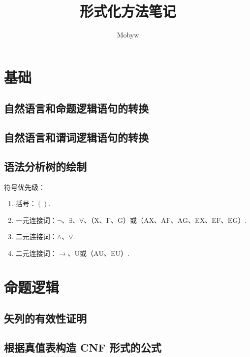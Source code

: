 \documentclass[cn, hazy, blue, normal, 12pt]{elegantnote}
\title{形式化方法笔记}
\author{Mobyw}
\institute{Created by Elegant\LaTeX{}}
\date{\zhtoday}
\begin{document}
\maketitle

\section{基础}

\subsection{自然语言和命题逻辑语句的转换}



\subsection{自然语言和谓词逻辑语句的转换}



\subsection{语法分析树的绘制}

符号优先级：

\begin{enumerate}
    \item 括号：$()$.
    \item 一元连接词：$\neg$、$\exists$、$\forall$、（$\mathrm{X}$、$\mathrm{F}$、$\mathrm{G}$）或（$\mathrm{AX}$、$\mathrm{AF}$、$\mathrm{AG}$、$\mathrm{EX}$、$\mathrm{EF}$、$\mathrm{EG}$）.
    \item 二元连接词：$\wedge$、$\vee$.
    \item 二元连接词：$\rightarrow$、$\mathrm{U}$或（$\mathrm{AU}$、$\mathrm{EU}$）.
\end{enumerate}

\section{命题逻辑}

\subsection{矢列的有效性证明}



\subsection{根据真值表构造 CNF 形式的公式}
\end{document}

